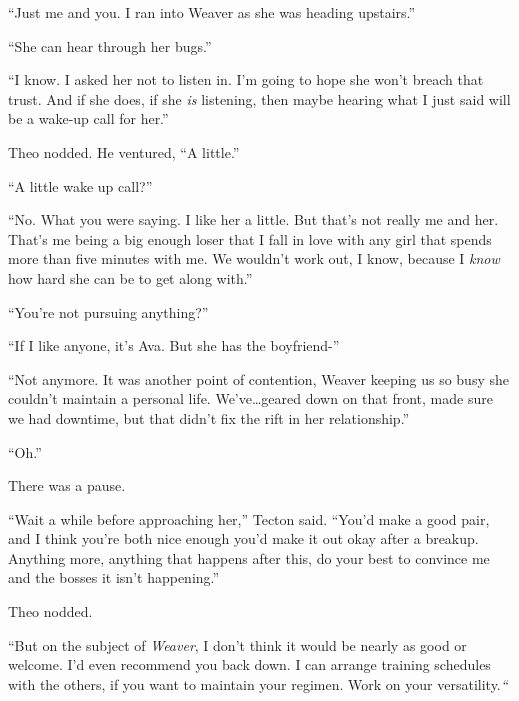 ``Just me and you.  I ran into Weaver as she was heading upstairs.''



``She can hear through her bugs.''



``I know.  I asked her not to listen in.  I'm going to hope she won't breach that trust.  And if she does, if she \emph{is} listening, then maybe hearing what I just said will be a wake-up call for her.''



Theo nodded.  He ventured, ``A little.''



``A little wake up call?''



``No.  What you were saying.  I like her a little.  But that's not really me and her.  That's me being a big enough loser that I fall in love with any girl that spends more than five minutes with me.  We wouldn't work out, I know, because I \emph{know} how hard she can be to get along with.''



``You're not pursuing anything?''



``If I like anyone, it's Ava.  But she has the boyfriend-''



``Not anymore.  It was another point of contention, Weaver keeping us so busy she couldn't maintain a personal life.  We've\ldots geared down on that front, made sure we had downtime, but that didn't fix the rift in her relationship.''



``Oh.''



There was a pause.



``Wait a while before approaching her,'' Tecton said.  ``You'd make a good pair, and I think you're both nice enough you'd make it out okay after a breakup.  Anything more, anything that happens after this, do your best to convince me and the bosses it isn't happening.''



Theo nodded.



``But on the subject of \emph{Weaver}, I don't think it would be nearly as good or welcome.  I'd even recommend you back down.  I can arrange training schedules with the others, if you want to maintain your regimen.  Work on your versatility.\emph{``}




